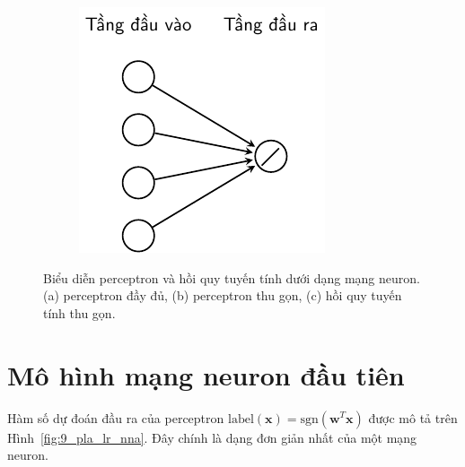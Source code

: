 \begin{figure}[h]
\begin{subfigure}{0.3\textwidth}
    \caption{}
    \label{fig:9_pla_lr_nnb}
    \end{subfigure}
    \begin{subfigure}{0.3\textwidth}
    \includegraphics[width=1.02\linewidth]{Chapters/05_NeuralNetworks/09_perceptron/latex/lr_nn.pdf}
    \caption{}
    \label{fig:9_pla_lr_nnc}
    \end{subfigure}
    \caption{
    Biểu diễn perceptron và hồi quy tuyến tính dưới dạng mạng neuron. (a) perceptron đầy đủ, (b) perceptron thu gọn, (c) hồi quy tuyến tính thu gọn. 
    }
    \label{fig:9_pla_lr_nn}
\end{figure}

\section{Mô hình mạng neuron đầu tiên}
Hàm số dự đoán đầu ra của perceptron $\text{label}(\mathbf{x}) = \text{sgn}(\mathbf{w}^T\mathbf{x})$ được mô tả trên Hình~\ref{fig:9_pla_lr_nna}. Đây chính là dạng đơn giản nhất của một mạng neuron. 

